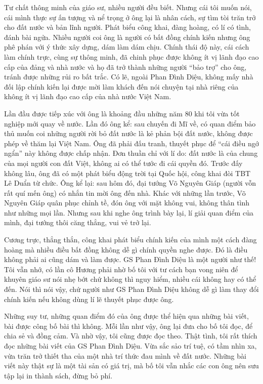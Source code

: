 

Tư chất thông minh của giáo sư, nhiều người đều biết. Nhưng cái tôi muốn nói, cái mình thực sự ấn tượng và nể trọng ở ông lại là nhân cách, sự tìm tòi trăn trở cho đất nước và bản lĩnh người. Phát biểu công khai, đàng hoàng, có lí có tình, đánh bài ngửa. Nhiều người coi ông là người có bất đồng chính kiến nhưng ông phê phán với ý thức xây dựng, dám làm dám chịu. Chính thái độ này, cái cách làm chính trực, cùng sự thông minh, đã chinh phục được không ít vị lãnh đạo cao cấp của đảng và nhà nước và họ đã trở thành những người “bảo trợ” cho ông, tránh được những rủi ro bất trắc. Có lẽ, ngoài Phan Đình Diệu, không mấy nhà đối lập chính kiến lại được mời làm khách đến nói chuyện tại nhà riêng của không ít vị lãnh đạo cao cấp của nhà nước Việt Nam.

 

Lần đầu được tiếp xúc với ông là khoảng đầu những năm 80 khi tôi vừa tốt nghiệp mới quay về nước. Lần đó ông kể: sau chuyến đi Mĩ về, có quan điểm bảo thủ muốn coi những người rời bỏ đất nước là kẻ phản bội đất nước, không được phép về thăm lại Việt Nam. Ông đã phải đấu tranh, thuyết phục để “cái điều ngớ ngẩn” này không được chấp nhận. Đơn thuần chỉ với lí do: đất nước là của chung của mọi người con đất Việt, không ai có thể tước đi cái quyền đó. Trước đấy không lâu, ông đã có một phát biểu động trời tại Quốc hội, công khai đòi TBT Lê Duẩn từ chức. Ông kể lại: sau hôm đó, đại tướng Võ Nguyên Giáp (người vỗn rất quí mến ông) có nhắn tin mời ông đến nhà. Khác với những lần trước, Võ Nguyên Giáp quân phục chỉnh tề, đón ông với mặt không vui, không thân tình như những mọi lần. Nhưng sau khi nghe ông trình bày lại, lí giải quan điểm của mình, đại tướng thôi căng thẳng, vui vẻ trở lại.

 

Cương trực, thẳng thắn, công khai phát biểu chính kiến của mình một cách đàng hoàng mà nhiều điều bất đồng không dễ gì chính quyền nghe được. Đó là điều không phải ai cũng dám và làm được. GS Phan Đình Diệu là một người như thế! Tôi vẫn nhớ, có lần cô Hương phải nhờ bố tôi với tư cách bạn vong niên để khuyên giáo sư nói nhẹ bớt chứ không thì nguy hiểm, nhiều cái không hay có thể đến. Nói thì nói vậy, chứ người như GS Phan Đình Diệu không dễ gì làm thay đổi chính kiến nếu không dùng lí lẽ thuyết phục được ông.

 

Những suy tư, những quan điểm đó của ông được thể hiện qua những bài viết, bài được công bố bài thì không. Mỗi lần như vậy, ông lại đưa cho bố tôi đọc, để chia sẻ và đồng cảm. Và nhờ vậy, tôi cũng được đọc theo. Thật tình, tôi rất thích đọc những bài viết của GS Phan Đình Diệu. Vừa sắc sảo trí tuệ, có tầm nhìn xa, vừa trăn trở thiết tha của một nhà trí thức đau mình về đất nước. Những bài viết này thật sự là một tài sản có giá trị, mà bố tôi vẫn nhắc các con ông nên sưu tập lại in thành sách, đừng bỏ phí.

